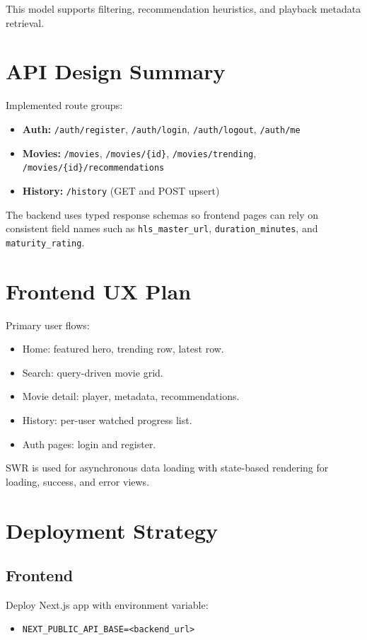\documentclass[conference]{IEEEtran}
\begin{document}
This model supports filtering, recommendation heuristics, and playback metadata retrieval.

\section{API Design Summary}
Implemented route groups:
\begin{itemize}
\item \textbf{Auth:} \texttt{/auth/register}, \texttt{/auth/login}, \texttt{/auth/logout}, \texttt{/auth/me}
\item \textbf{Movies:} \texttt{/movies}, \texttt{/movies/\{id\}}, \texttt{/movies/trending}, \texttt{/movies/\{id\}/recommendations}
\item \textbf{History:} \texttt{/history} (GET and POST upsert)
\end{itemize}

The backend uses typed response schemas so frontend pages can rely on consistent field names such as \texttt{hls\_master\_url}, \texttt{duration\_minutes}, and \texttt{maturity\_rating}.

\section{Frontend UX Plan}
Primary user flows:
\begin{itemize}
\item Home: featured hero, trending row, latest row.
\item Search: query-driven movie grid.
\item Movie detail: player, metadata, recommendations.
\item History: per-user watched progress list.
\item Auth pages: login and register.
\end{itemize}

SWR is used for asynchronous data loading with state-based rendering for loading, success, and error views.

\section{Deployment Strategy}
\subsection{Frontend}
Deploy Next.js app with environment variable:
\begin{itemize}
\item \texttt{NEXT\_PUBLIC\_API\_BASE=<backend\_url>}
\end{itemize}
\end{document}
